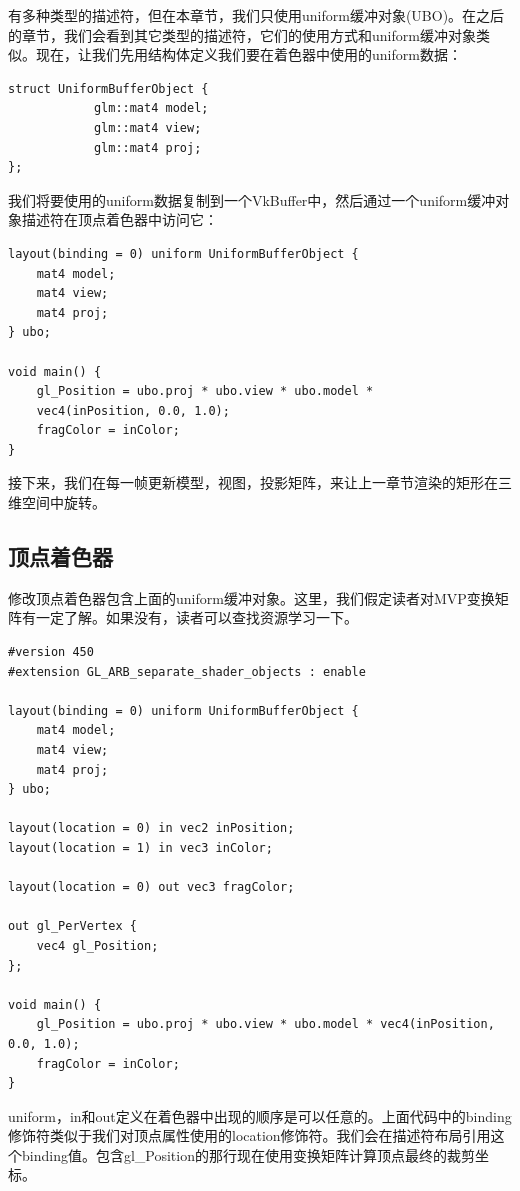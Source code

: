 \documentclass{ctexart}
\begin{document}
有多种类型的描述符，但在本章节，我们只使用uniform缓冲对象(UBO)。在之后的章节，我们会看到其它类型的描述符，它们的使用方式和uniform缓冲对象类似。现在，让我们先用结构体定义我们要在着色器中使用的uniform数据：

\begin{lstlisting}[language={[ANSI]C}]
struct UniformBufferObject {
			glm::mat4 model;
			glm::mat4 view;
			glm::mat4 proj;
};
\end{lstlisting}

我们将要使用的uniform数据复制到一个VkBuffer中，然后通过一个uniform缓冲对象描述符在顶点着色器中访问它：

\begin{lstlisting}[language={[ANSI]C}]
layout(binding = 0) uniform UniformBufferObject {
	mat4 model;
	mat4 view;
	mat4 proj;
} ubo;

void main() {
	gl_Position = ubo.proj * ubo.view * ubo.model *
	vec4(inPosition, 0.0, 1.0);
	fragColor = inColor;
}
\end{lstlisting}

接下来，我们在每一帧更新模型，视图，投影矩阵，来让上一章节渲染的矩形在三维空间中旋转。

\subsection{顶点着色器}

修改顶点着色器包含上面的uniform缓冲对象。这里，我们假定读者对MVP变换矩阵有一定了解。如果没有，读者可以查找资源学习一下。

\begin{lstlisting}[language={[ANSI]C}]
#version 450
#extension GL_ARB_separate_shader_objects : enable

layout(binding = 0) uniform UniformBufferObject {
	mat4 model;
	mat4 view;
	mat4 proj;
} ubo;

layout(location = 0) in vec2 inPosition;
layout(location = 1) in vec3 inColor;

layout(location = 0) out vec3 fragColor;

out gl_PerVertex {
	vec4 gl_Position;
};

void main() {
	gl_Position = ubo.proj * ubo.view * ubo.model * vec4(inPosition, 0.0, 1.0);
	fragColor = inColor;
}
\end{lstlisting}

uniform，in和out定义在着色器中出现的顺序是可以任意的。上面代码中的binding修饰符类似于我们对顶点属性使用的location修饰符。我们会在描述符布局引用这个binding值。包含gl\_Position的那行现在使用变换矩阵计算顶点最终的裁剪坐标。
\end{document}
